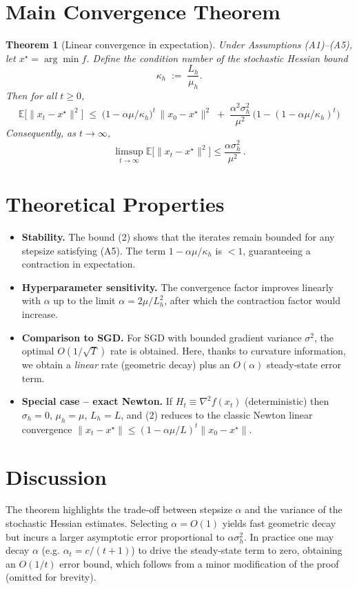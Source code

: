 \documentclass{article}
\newtheorem{theorem}{Theorem}
\begin{document}
\section*{Main Convergence Theorem}
\begin{theorem}[Linear convergence in expectation]\label{thm:linear}
Under Assumptions (A1)–(A5), let $x^{\star}=\arg\min f$.  
Define the condition number of the stochastic Hessian bound
\[
\kappa_{h}\;:=\;\frac{L_{h}}{\mu_{h}}.
\]
Then for all $t\ge0$,
\[
\boxed{\;
\mathbb{E}\bigl[\|x_{t}-x^{\star}\|^{2}\bigr]\;\le\;
\bigl(1-\alpha\mu/\kappa_{h}\bigr)^{t}\,\|x_{0}-x^{\star}\|^{2}
\;+\;
\frac{\alpha^{2}\sigma_{h}^{2}}{\mu^{2}}\,\bigl(1-(1-\alpha\mu/\kappa_{h})^{t}\bigr)
\;}
\tag{2}
\]
Consequently, as $t\to\infty$,
\[
\limsup_{t\to\infty}\mathbb{E}\bigl[\|x_{t}-x^{\star}\|^{2}\bigr]\le
\frac{\alpha\sigma_{h}^{2}}{\mu^{2}}\,.
\]
\end{theorem}

\section*{Theoretical Properties}
\begin{itemize}
\item \textbf{Stability.} The bound (2) shows that the iterates remain bounded for any
stepsize satisfying (A5). The term $1-\alpha\mu/\kappa_{h}$ is $<1$, guaranteeing a contraction in expectation.
\item \textbf{Hyperparameter sensitivity.} The convergence factor improves linearly with $\alpha$ up to the limit $\alpha=2\mu/L_{h}^{2}$, after which the contraction factor would increase.
\item \textbf{Comparison to SGD.} For SGD with bounded gradient variance $\sigma^{2}$, the optimal $O(1/\sqrt{T})$ rate is obtained. Here, thanks to curvature information, we obtain a \emph{linear} rate (geometric decay) plus an $O(\alpha)$ steady‑state error term.
\item \textbf{Special case – exact Newton.} If $H_{t}\equiv\nabla^{2}f(x_{t})$ (deterministic) then $\sigma_{h}=0$, $\mu_{h}=\mu$, $L_{h}=L$, and (2) reduces to the classic Newton linear convergence $\|x_{t}-x^{\star}\|\le (1-\alpha\mu/L)^{t}\|x_{0}-x^{\star}\|$.
\end{itemize}

\section*{Discussion}
The theorem highlights the trade‑off between stepsize $\alpha$ and the variance of the stochastic Hessian estimates. Selecting $\alpha=O(1)$ yields fast geometric decay but incurs a larger asymptotic error proportional to $\alpha\sigma_{h}^{2}$. In practice one may decay $\alpha$ (e.g. $\alpha_{t}=c/(t+1)$) to drive the steady‑state term to zero, obtaining an $O(1/t)$ error bound, which follows from a minor modification of the proof (omitted for brevity).
\end{document}
